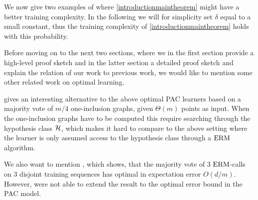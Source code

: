 We now give two examples of where \cref{introductionmaintheorem} might have a better training complexity. In the following we will for simplicity set $ \delta $ equal to a small constant, thus the training complexity of \cref{introductionmaintheorem} holds with this probability.  



\newline \linebreak
Before moving on to the next two sections, where we in the first section provide a high-level proof sketch and in the latter section a detailed proof sketch and explain the relation of our work to previous work, we would like to mention some other related work on optimal learning. 

\cite{optimalwithoutuniformconvergence} gives an interesting alternative to the above optimal PAC learners based on a majority vote of $ m/4 $ one-inclusion graphs, given $ \Theta(m) $ points as input. When the one-inclusion graphs have to be computed this require searching through the hypothesis class $ \mathcal{H} $, which makes it hard to compare to the above setting where the learner is only assumed access to the hypothesis class through a $ \mathrm{ERM} $ algorithm. 

We also want to mention \cite{majorityofthree}, which shows, that the majority vote of 3 $ \mathrm{ERM} $-calls on 3 disjoint training sequences has optimal in expectation error $ O(d/m) $. However, \cite{majorityofthree} were not able to extend the result to the optimal error bound in the PAC model. 
